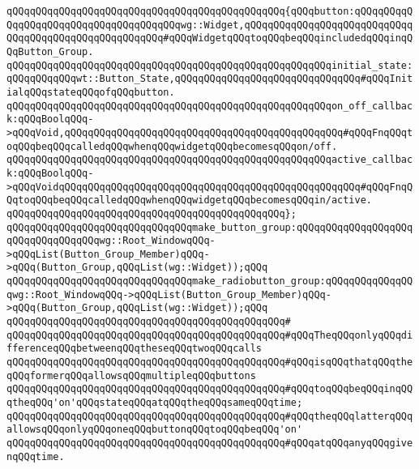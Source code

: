 \verb|qQQqqQQqqQQqqQQqqQQqqQQqqQQqqQQqqQQqqQQqqQQqqQQq{qQQqbutton:qQQqqQQqqQQqqQQqqQQqqQQqqQQqqQQqqQQqqQQqwg::Widget,qQQqqQQqqQQqqQQqqQQqqQQqqQQqqQQqqQQqqQQqqQQqqQQqqQQqqQQq#qQQqWidgetqQQqtoqQQqbeqQQqincludedqQQqinqQQqButton_Group.|\newline
\verb|qQQqqQQqqQQqqQQqqQQqqQQqqQQqqQQqqQQqqQQqqQQqqQQqqQQqqQQqinitial_state:qQQqqQQqqQQqwt::Button_State,qQQqqQQqqQQqqQQqqQQqqQQqqQQqqQQq#qQQqInitialqQQqstateqQQqofqQQqbutton.|\newline
\newline
\verb|qQQqqQQqqQQqqQQqqQQqqQQqqQQqqQQqqQQqqQQqqQQqqQQqqQQqqQQqon_off_callback:qQQqBoolqQQq->qQQqVoid,qQQqqQQqqQQqqQQqqQQqqQQqqQQqqQQqqQQqqQQqqQQqqQQq#qQQqFnqQQqtoqQQqbeqQQqcalledqQQqwhenqQQqwidgetqQQqbecomesqQQqon/off.|\newline
\verb|qQQqqQQqqQQqqQQqqQQqqQQqqQQqqQQqqQQqqQQqqQQqqQQqqQQqqQQqactive_callback:qQQqBoolqQQq->qQQqVoidqQQqqQQqqQQqqQQqqQQqqQQqqQQqqQQqqQQqqQQqqQQqqQQqqQQq#qQQqFnqQQqtoqQQqbeqQQqcalledqQQqwhenqQQqwidgetqQQqbecomesqQQqin/active.|\newline
\verb|qQQqqQQqqQQqqQQqqQQqqQQqqQQqqQQqqQQqqQQqqQQqqQQq};|\newline
\newline
\verb|qQQqqQQqqQQqqQQqqQQqqQQqqQQqqQQqmake_button_group:qQQqqQQqqQQqqQQqqQQqqQQqqQQqqQQqqQQqwg::Root_WindowqQQq->qQQqList(Button_Group_Member)qQQq->qQQq(Button_Group,qQQqList(wg::Widget));qQQq|\newline
\verb|qQQqqQQqqQQqqQQqqQQqqQQqqQQqqQQqmake_radiobutton_group:qQQqqQQqqQQqqQQqwg::Root_WindowqQQq->qQQqList(Button_Group_Member)qQQq->qQQq(Button_Group,qQQqList(wg::Widget));qQQq|\newline
\verb|qQQqqQQqqQQqqQQqqQQqqQQqqQQqqQQqqQQqqQQqqQQqqQQq#|\newline
\verb|qQQqqQQqqQQqqQQqqQQqqQQqqQQqqQQqqQQqqQQqqQQqqQQq#qQQqTheqQQqonlyqQQqdifferenceqQQqbetweenqQQqtheseqQQqtwoqQQqcalls|\newline
\verb|qQQqqQQqqQQqqQQqqQQqqQQqqQQqqQQqqQQqqQQqqQQqqQQq#qQQqisqQQqthatqQQqtheqQQqformerqQQqallowsqQQqmultipleqQQqbuttons|\newline
\verb|qQQqqQQqqQQqqQQqqQQqqQQqqQQqqQQqqQQqqQQqqQQqqQQq#qQQqtoqQQqbeqQQqinqQQqtheqQQq'on'qQQqstateqQQqatqQQqtheqQQqsameqQQqtime;|\newline
\verb|qQQqqQQqqQQqqQQqqQQqqQQqqQQqqQQqqQQqqQQqqQQqqQQq#qQQqtheqQQqlatterqQQqallowsqQQqonlyqQQqoneqQQqbuttonqQQqtoqQQqbeqQQq'on'|\newline
\verb|qQQqqQQqqQQqqQQqqQQqqQQqqQQqqQQqqQQqqQQqqQQqqQQq#qQQqatqQQqanyqQQqgivenqQQqtime.|\newline

